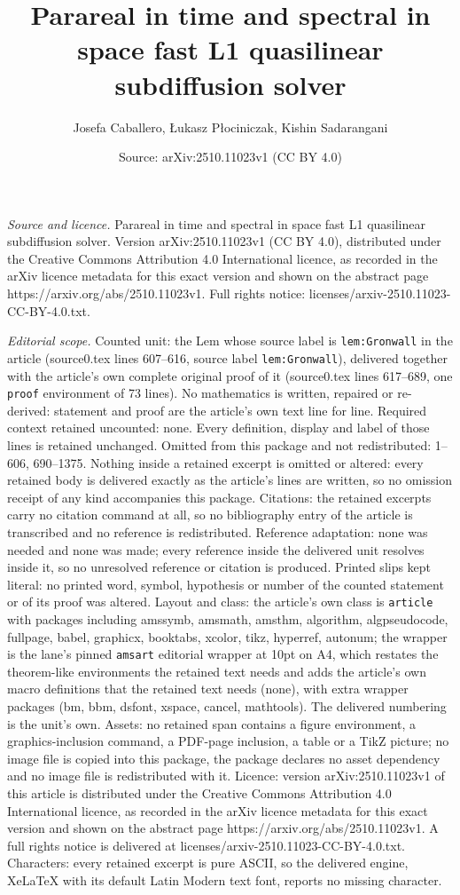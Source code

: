 \documentclass[10pt,a4paper]{amsart}
\title[Parareal in time and spectral in space fast L1 quasilinear s]{Parareal in time and spectral in space fast L1 quasilinear subdiffusion solver}
\author{Josefa Caballero, {\L}ukasz P{\l}ociniczak, Kishin Sadarangani}
\date{Source: arXiv:2510.11023v1 (CC BY 4.0)}
\begin{document}
\maketitle

\noindent\emph{Source and licence.} Parareal in time and spectral in space fast L1 quasilinear subdiffusion solver. Version arXiv:2510.11023v1 (CC BY 4.0), distributed under the Creative Commons Attribution 4.0 International licence, as recorded in the arXiv licence metadata for this exact version and shown on the abstract page https://arxiv.org/abs/2510.11023v1. Full rights notice: licenses/arxiv-2510.11023-CC-BY-4.0.txt.\par\smallskip

\noindent\textit{Editorial scope.} Counted unit: the Lem whose source label is \texttt{lem:Gronwall} in the article (source0.tex lines 607--616, source label \texttt{lem:Gronwall}), delivered together with the article's own complete original proof of it (source0.tex lines 617--689, one \texttt{proof} environment of 73 lines). No mathematics is written, repaired or re-derived: statement and proof are the article's own text line for line. Required context retained uncounted: none. Every definition, display and label of those lines is retained unchanged. Omitted from this package and not redistributed: 1--606, 690--1375. Nothing inside a retained excerpt is omitted or altered: every retained body is delivered exactly as the article's lines are written, so no omission receipt of any kind accompanies this package. Citations: the retained excerpts carry no citation command at all, so no bibliography entry of the article is transcribed and no reference is redistributed. Reference adaptation: none was needed and none was made; every reference inside the delivered unit resolves inside it, so no unresolved reference or citation is produced. Printed slips kept literal: no printed word, symbol, hypothesis or number of the counted statement or of its proof was altered. Layout and class: the article's own class is \texttt{article} with packages including amssymb, amsmath, amsthm, algorithm, algpseudocode, fullpage, babel, graphicx, booktabs, xcolor, tikz, hyperref, autonum; the wrapper is the lane's pinned \texttt{amsart} editorial wrapper at 10pt on A4, which restates the theorem-like environments the retained text needs and adds the article's own macro definitions that the retained text needs (none), with extra wrapper packages (bm, bbm, dsfont, xspace, cancel, mathtools). The delivered numbering is the unit's own. Assets: no retained span contains a figure environment, a graphics-inclusion command, a PDF-page inclusion, a table or a TikZ picture; no image file is copied into this package, the package declares no asset dependency and no image file is redistributed with it. Licence: version arXiv:2510.11023v1 of this article is distributed under the Creative Commons Attribution 4.0 International licence, as recorded in the arXiv licence metadata for this exact version and shown on the abstract page https://arxiv.org/abs/2510.11023v1. A full rights notice is delivered at licenses/arxiv-2510.11023-CC-BY-4.0.txt. Characters: every retained excerpt is pure ASCII, so the delivered engine, XeLaTeX with its default Latin Modern text font, reports no missing character.
\end{document}
